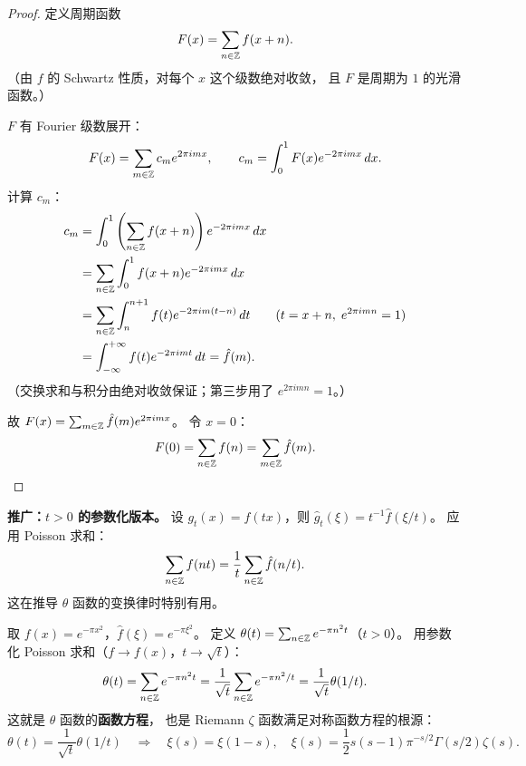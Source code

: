 \begin{proof}
定义周期函数
\[
  F(x) = \sum_{n \in \mathbb{Z}} f(x + n).
\]
（由 $f$ 的 Schwartz 性质，对每个 $x$ 这个级数绝对收敛，
且 $F$ 是周期为 $1$ 的光滑函数。）

$F$ 有 Fourier 级数展开：
\[
  F(x) = \sum_{m \in \mathbb{Z}} c_m e^{2\pi i mx},
  \qquad c_m = \int_0^1 F(x) e^{-2\pi imx}\, dx.
\]
计算 $c_m$：
\begin{align}
  c_m
  &= \int_0^1 \left(\sum_{n \in \mathbb{Z}} f(x+n)\right) e^{-2\pi imx}\, dx \\
  &= \sum_{n \in \mathbb{Z}} \int_0^1 f(x+n) e^{-2\pi imx}\, dx \\
  &= \sum_{n \in \mathbb{Z}} \int_n^{n+1} f(t) e^{-2\pi im(t-n)}\, dt
    \qquad (t = x + n,\; e^{2\pi imn} = 1) \\
  &= \int_{-\infty}^{+\infty} f(t) e^{-2\pi imt}\, dt = \hat{f}(m).
\end{align}
（交换求和与积分由绝对收敛保证；第三步用了 $e^{2\pi imn} = 1$。）

故 $F(x) = \sum_{m \in \mathbb{Z}} \hat{f}(m) e^{2\pi imx}$。
令 $x = 0$：
\[
  F(0) = \sum_{n \in \mathbb{Z}} f(n) = \sum_{m \in \mathbb{Z}} \hat{f}(m). \qedhere
\]
\end{proof}

\textbf{推广：$t > 0$ 的参数化版本。}
设 $g_t(x) = f(tx)$，则 $\hat{g}_t(\xi) = t^{-1}\hat{f}(\xi/t)$。
应用 Poisson 求和：
\[
  \sum_{n \in \mathbb{Z}} f(nt) = \frac{1}{t} \sum_{n \in \mathbb{Z}} \hat{f}(n/t).
\]
这在推导 $\theta$ 函数的变换律时特别有用。

\begin{example}
\label{ex:theta-poisson}
取 $f(x) = e^{-\pi x^2}$，$\hat{f}(\xi) = e^{-\pi\xi^2}$。
定义 $\theta(t) = \sum_{n \in \mathbb{Z}} e^{-\pi n^2 t}$（$t > 0$）。
用参数化 Poisson 求和（$f \to f(x)$，$t \to \sqrt{t}$）：
\[
  \theta(t) = \sum_{n \in \mathbb{Z}} e^{-\pi n^2 t}
  = \frac{1}{\sqrt{t}} \sum_{n \in \mathbb{Z}} e^{-\pi n^2/t}
  = \frac{1}{\sqrt{t}} \theta(1/t).
\]
这就是 $\theta$ 函数的\textbf{函数方程}，
也是 Riemann $\zeta$ 函数满足对称函数方程的根源：
\[
  \theta(t) = \frac{1}{\sqrt{t}} \theta(1/t)
  \quad \Longrightarrow \quad
  \xi(s) = \xi(1-s),
  \quad \xi(s) = \frac{1}{2}s(s-1)\pi^{-s/2}\Gamma(s/2)\zeta(s).
\]
\end{example}

